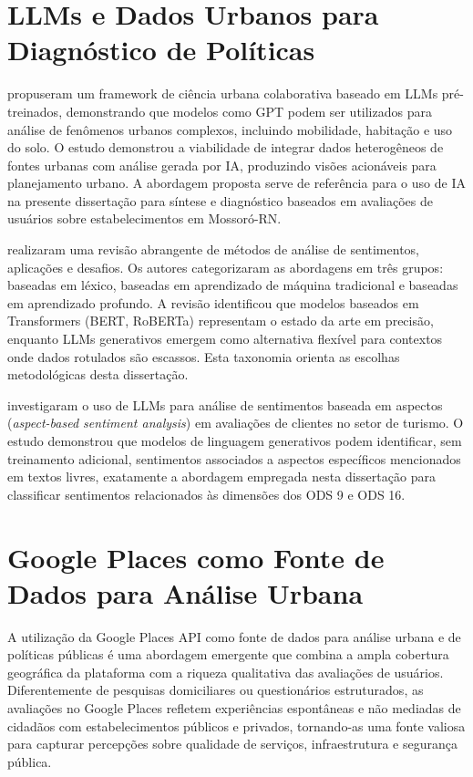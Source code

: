 \section{LLMs e Dados Urbanos para Diagnóstico de Políticas}
\label{sec:tr-llm-urbano}

\citeauthor{fu2023} \citeyear{fu2023} propuseram um framework de ciência urbana colaborativa baseado em LLMs pré-treinados, demonstrando que modelos como \gls{GPT} podem ser utilizados para análise de fenômenos urbanos complexos, incluindo mobilidade, habitação e uso do solo. O estudo demonstrou a viabilidade de integrar dados heterogêneos de fontes urbanas com análise gerada por IA, produzindo visões acionáveis para planejamento urbano. A abordagem proposta serve de referência para o uso de IA na presente dissertação para síntese e diagnóstico baseados em avaliações de usuários sobre estabelecimentos em Mossoró-RN.

\citeauthor{wankhade2022} \citeyear{wankhade2022} realizaram uma revisão abrangente de métodos de análise de sentimentos, aplicações e desafios. Os autores categorizaram as abordagens em três grupos: baseadas em léxico, baseadas em aprendizado de máquina tradicional e baseadas em aprendizado profundo. A revisão identificou que modelos baseados em Transformers (BERT, RoBERTa) representam o estado da arte em precisão, enquanto LLMs generativos emergem como alternativa flexível para contextos onde dados rotulados são escassos. Esta taxonomia orienta as escolhas metodológicas desta dissertação.

\citeauthor{agua2025} \citeyear{agua2025} investigaram o uso de LLMs para análise de sentimentos baseada em aspectos (\textit{aspect-based sentiment analysis}) em avaliações de clientes no setor de turismo. O estudo demonstrou que modelos de linguagem generativos podem identificar, sem treinamento adicional, sentimentos associados a aspectos específicos mencionados em textos livres, exatamente a abordagem empregada nesta dissertação para classificar sentimentos relacionados às dimensões dos ODS 9 e ODS 16.

\section{Google Places como Fonte de Dados para Análise Urbana}
\label{sec:tr-google-places}

A utilização da Google Places API como fonte de dados para análise urbana e de políticas públicas é uma abordagem emergente que combina a ampla cobertura geográfica da plataforma com a riqueza qualitativa das avaliações de usuários. Diferentemente de pesquisas domiciliares ou questionários estruturados, as avaliações no Google Places refletem experiências espontâneas e não mediadas de cidadãos com estabelecimentos públicos e privados, tornando-as uma fonte valiosa para capturar percepções sobre qualidade de serviços, infraestrutura e segurança pública.

